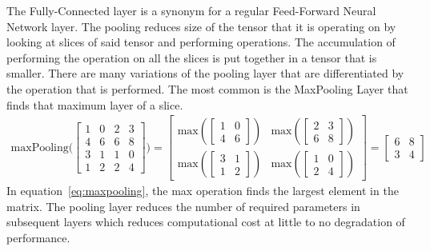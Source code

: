 The Fully-Connected layer is a synonym for a regular Feed-Forward Neural Network layer. The pooling reduces size of the tensor that it is operating on by looking at slices of said tensor and performing operations. The accumulation of performing the operation on all the slices is put together in a tensor that is smaller. There are many variations of the pooling layer that are differentiated by the operation that is performed. The most common is the MaxPooling Layer that finds that maximum layer of a slice. \begin{align}\label{eq:maxpooling}
	\text{maxPooling}\Bigg( 
	\begin{bmatrix}
		1 & 0 & 2 & 3 \\
		4 & 6 & 6 & 8 \\
		3 & 1 & 1 & 0 \\
		1 & 2 & 2 & 4 
	\end{bmatrix} 
\Bigg)=\begin{bmatrix}
	\text{max} (\begin{bmatrix}
		1 & 0 \\
		4 & 6
	\end{bmatrix}) & \text{max} (\begin{bmatrix}
	2 & 3 \\
	6 & 8
\end{bmatrix}) \\
\text{max} (\begin{bmatrix}
	3 & 1 \\
	1 & 2
\end{bmatrix}) & \text{max} (\begin{bmatrix}
	1 & 0 \\
	2 & 4
	\end{bmatrix})
\end{bmatrix}
=\begin{bmatrix}
	6 & 8 \\
	3 & 4
\end{bmatrix}
\end{align} In equation~\ref{eq:maxpooling}, the max operation finds the largest element in the matrix. The pooling layer reduces the number of required parameters in subsequent layers which reduces computational cost at little to no degradation of performance. \cite{geron_aurelien_2019}

